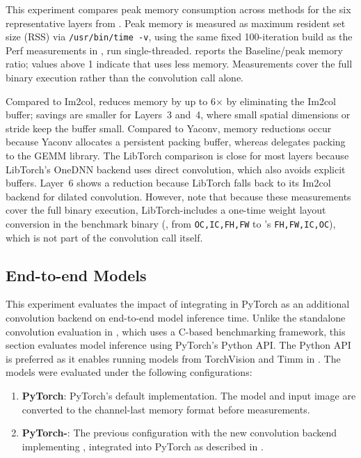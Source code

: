 This experiment compares peak memory consumption across methods for the six representative layers from .
Peak memory is measured as maximum resident set size (RSS) via \texttt{/usr/bin/time -v}, using the same fixed 100-iteration build as the Perf measurements in , run single-threaded.
 reports the Baseline/\algname peak memory ratio; values above 1 indicate that \algname uses less memory.
Measurements cover the full binary execution rather than the convolution call alone.

Compared to Im2col, \algname reduces memory by up to 6$\times$ by eliminating the Im2col buffer; savings are smaller for Layers~3 and~4, where small spatial dimensions or stride keep the buffer small.
Compared to Yaconv, memory reductions occur because Yaconv allocates a persistent packing buffer, whereas \algname delegates packing to the GEMM library.
The LibTorch comparison is close for most layers because LibTorch's OneDNN backend uses direct convolution, which also avoids explicit buffers.
Layer~6 shows a reduction because LibTorch falls back to its Im2col backend for dilated convolution.
However, note that because these measurements cover the full binary execution, LibTorch-\algname includes a one-time weight layout conversion in the benchmark binary (\ie, from \texttt{OC,IC,FH,FW} to \algname's \texttt{FH,FW,IC,OC}), which is not part of the convolution call itself.

\subsection{End-to-end Models}
\label{sec:end-to-end}

This experiment evaluates the impact of integrating \algname in PyTorch as an additional convolution backend on end-to-end model inference time.
Unlike the standalone convolution evaluation in , which uses a C-based benchmarking framework, this section evaluates model inference using PyTorch's Python API. 
The Python API is preferred as it enables running models from TorchVision and Timm in .
The models were evaluated under the following configurations:

\begin{enumerate}
    \item \textbf{PyTorch}: PyTorch's default implementation.
    The model and input image are converted to the channel-last memory format before measurements.

    \item \textbf{PyTorch-\algname}: The previous configuration with the new convolution backend implementing \algname, integrated into PyTorch as described in .
\end{enumerate}

